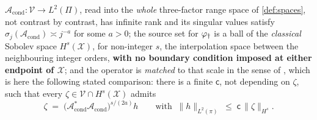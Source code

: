 %
%
%
\begin{assumption}\label{ass:hilbscale}
$\mathcal A_{\mathrm{cond}}:\mathcal V\to L^{2}(\Pi)$, read into the \emph{whole} three-factor range
space of \cref{def:spaces}, not contrast by contrast, has infinite rank and its singular values satisfy
$\sigma_j(\mathcal A_{\mathrm{cond}})\asymp j^{-a}$ for some $a>0$; the source set for $\varphi_{\dagger}$ is a
ball of the \emph{classical} Sobolev space $H^{s}(\mathcal X)$, for non-integer $s$, the interpolation
space between the neighbouring integer orders, \textbf{with no boundary condition imposed at either
endpoint of $\mathcal X$}; and the operator is \emph{matched} to that scale in the sense of
\citet[\S8.5]{engl2000}, which is here the following stated comparison: there is a finite $\mathsf c$,
not depending on $\zeta$, such that every $\zeta\in\mathcal V\cap H^{s}(\mathcal X)$ admits
\begin{equation}\label{eq:h1match}
\zeta\;=\;\big(\mathcal A^{\ast}_{\mathrm{cond}}\mathcal A_{\mathrm{cond}}\big)^{s/(2a)}h
\qquad\text{with }\ \|h\|_{L^{2}(\pi)}\;\le\;\mathsf c\,\|\zeta\|_{H^{s}} .
\end{equation}
\end{assumption}

